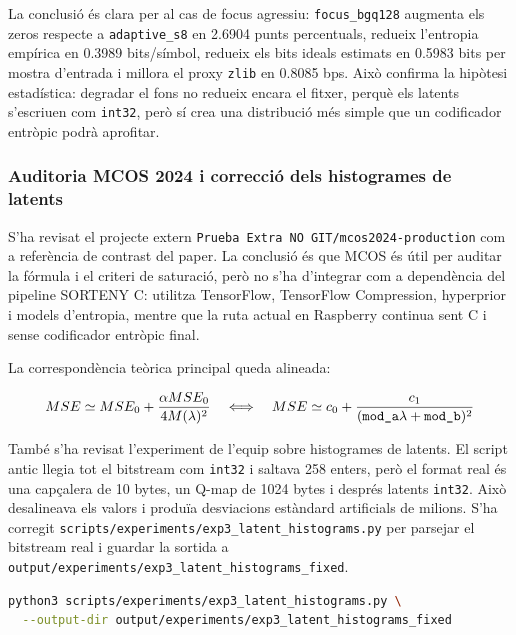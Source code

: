 \documentclass[11pt,a4paper]{article}
\begin{document}
La conclusió és clara per al cas de focus agressiu: \texttt{focus\_bgq128} augmenta els zeros respecte a \texttt{adaptive\_s8} en 2.6904 punts percentuals, redueix l'entropia empírica en 0.3989 bits/símbol, redueix els bits ideals estimats en 0.5983 bits per mostra d'entrada i millora el proxy \texttt{zlib} en 0.8085 bps. Això confirma la hipòtesi estadística: degradar el fons no redueix encara el fitxer, perquè els latents s'escriuen com \texttt{int32}, però sí crea una distribució més simple que un codificador entròpic podrà aprofitar.

\subsubsection{Auditoria MCOS 2024 i correcció dels histogrames de latents}

S'ha revisat el projecte extern \texttt{Prueba Extra NO GIT/mcos2024-production} com a referència de contrast del paper. La conclusió és que MCOS és útil per auditar la fórmula i el criteri de saturació, però no s'ha d'integrar com a dependència del pipeline SORTENY C: utilitza TensorFlow, TensorFlow Compression, hyperprior i models d'entropia, mentre que la ruta actual en Raspberry continua sent C i sense codificador entròpic final.

La correspondència teòrica principal queda alineada:

\begin{equation}
  MSE \simeq MSE_0 + \frac{\alpha MSE_0}{4M(\lambda)^2}
  \quad \Longleftrightarrow \quad
  MSE \simeq c_0 + \frac{c_1}{(\text{\texttt{mod\_a}}\lambda + \text{\texttt{mod\_b}})^2}
\end{equation}

També s'ha revisat l'experiment de l'equip sobre histogrames de latents. El script antic llegia tot el bitstream com \texttt{int32} i saltava 258 enters, però el format real és una capçalera de 10 bytes, un Q-map de 1024 bytes i després latents \texttt{int32}. Això desalineava els valors i produïa desviacions estàndard artificials de milions. S'ha corregit \texttt{scripts/experiments/exp3\_latent\_histograms.py} per parsejar el bitstream real i guardar la sortida a \texttt{output/experiments/exp3\_latent\_histograms\_fixed}.

\begin{lstlisting}[language=bash]
python3 scripts/experiments/exp3_latent_histograms.py \
  --output-dir output/experiments/exp3_latent_histograms_fixed
\end{lstlisting}
\end{document}
